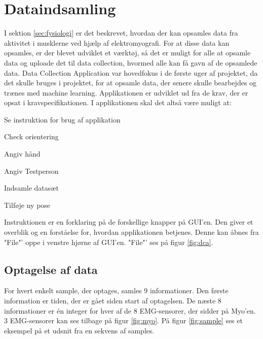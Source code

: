 \thispagestyle{fancy}
\chapter{Dataindsamling}
\label{chp:dataingsamlingChapter}
I sektion \ref{sec:fysiologi} er det beskrevet, hvordan der kan opsamles data fra aktivitet i musklerne ved hjælp af elektromyografi. For at disse data kan opsamles, er der blevet udviklet et værktøj, så det er muligt for alle at opsamle data og uploade det til data collection, hvormed alle kan få gavn af de opsamlede data. Data Collection Application var hovedfokus i de første uger af projektet, da det skulle bruges i projektet, for at opsamle data, der senere skulle bearbejdes og trænes med machine learning. Applikationen er udviklet ud fra de krav, der er opsat i kravspecifikationen\citep{RefWorks:8}. I applikationen skal det altså være muligt at:
\begin{myItemize}
	\item Se instruktion for brug af applikation
	\item Check orientering
	\item Angiv hånd
	\item Angiv Testperson
	\item Indsamle datasæt
	\item Tilføje ny pose
\end{myItemize}
Instruktionen er en forklaring på de forskellige knapper på GUI'en. Den giver et overblik og en forståelse for, hvordan applikationen betjenes. Denne kan åbnes fra "File"' oppe i venstre hjørne af GUI'en. "File"' ses på figur \ref{fig:dca}.

\section{Optagelse af data}
\label{sec:optagelsedata}
For hvert enkelt sample, der optages, samles 9 informationer. Den første information er tiden, der er gået siden start af optagelsen. De næste 8 informationer er én integer for hver af de 8 EMG-sensorer, der sidder på Myo'en. 3 EMG-sensorer kan ses tilbage på figur \ref{fig:myo}.
På figur \ref{fig:sample} ses et eksempel på et udsnit fra en sekvens af samples.


